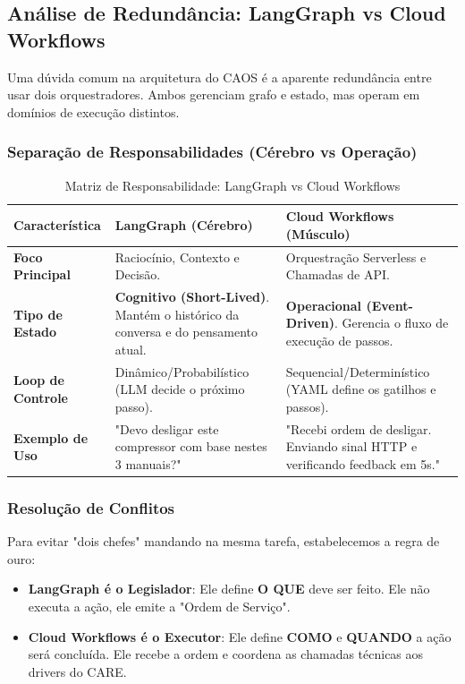 \documentclass[12pt, a4paper]{article}
\begin{document}
\subsection{Análise de Redundância: LangGraph vs Cloud Workflows}
Uma dúvida comum na arquitetura do CAOS é a aparente redundância entre usar dois orquestradores. Ambos gerenciam grafo e estado, mas operam em domínios de execução distintos.

\subsubsection{Separação de Responsabilidades (Cérebro vs Operação)}

\begin{table}[h!]
\centering
\begin{tabular}{|l|p{6cm}|p{6cm}|}
\hline
\textbf{Característica} & \textbf{LangGraph (Cérebro)} & \textbf{Cloud Workflows (Músculo)} \\ \hline
\textbf{Foco Principal} & Raciocínio, Contexto e Decisão. & Orquestração Serverless e Chamadas de API. \\ \hline
\textbf{Tipo de Estado} & \textbf{Cognitivo (Short-Lived)}. Mantém o histórico da conversa e do pensamento atual. & \textbf{Operacional (Event-Driven)}. Gerencia o fluxo de execução de passos. \\ \hline
\textbf{Loop de Controle} & Dinâmico/Probabilístico (LLM decide o próximo passo). & Sequencial/Determinístico (YAML define os gatilhos e passos). \\ \hline
\textbf{Exemplo de Uso} & "Devo desligar este compressor com base nestes 3 manuais?" & "Recebi ordem de desligar. Enviando sinal HTTP e verificando feedback em 5s." \\ \hline
\end{tabular}
\caption{Matriz de Responsabilidade: LangGraph vs Cloud Workflows}
\end{table}

\subsubsection{Resolução de Conflitos}
Para evitar "dois chefes" mandando na mesma tarefa, estabelecemos a regra de ouro:
\begin{itemize}
    \item \textbf{LangGraph é o Legislador}: Ele define \textbf{O QUE} deve ser feito. Ele não executa a ação, ele emite a "Ordem de Serviço".
    \item \textbf{Cloud Workflows é o Executor}: Ele define \textbf{COMO} e \textbf{QUANDO} a ação será concluída. Ele recebe a ordem e coordena as chamadas técnicas aos drivers do CARE.
\end{itemize}
\end{document}
